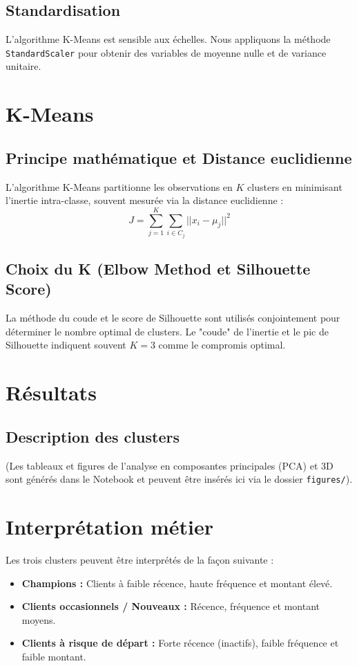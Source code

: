 \documentclass[12pt,a4paper]{article}
\begin{document}
\subsection{Standardisation}
L'algorithme K-Means est sensible aux échelles. Nous appliquons la méthode \texttt{StandardScaler} pour obtenir des variables de moyenne nulle et de variance unitaire.

\section{K-Means}
\subsection{Principe mathématique et Distance euclidienne}
L'algorithme K-Means partitionne les observations en $K$ clusters en minimisant l'inertie intra-classe, souvent mesurée via la distance euclidienne :
\begin{equation}
    J = \sum_{j=1}^{K} \sum_{i \in C_j} || x_i - \mu_j ||^2
\end{equation}
\subsection{Choix du K (Elbow Method et Silhouette Score)}
La méthode du coude et le score de Silhouette sont utilisés conjointement pour déterminer le nombre optimal de clusters. Le "coude" de l'inertie et le pic de Silhouette indiquent souvent $K=3$ comme le compromis optimal.

\section{Résultats}
\subsection{Description des clusters}
(Les tableaux et figures de l'analyse en composantes principales (PCA) et 3D sont générés dans le Notebook et peuvent être insérés ici via le dossier \texttt{figures/}).

\section{Interprétation métier}
Les trois clusters peuvent être interprétés de la façon suivante :
\begin{itemize}
    \item \textbf{Champions :} Clients à faible récence, haute fréquence et montant élevé.
    \item \textbf{Clients occasionnels / Nouveaux :} Récence, fréquence et montant moyens.
    \item \textbf{Clients à risque de départ :} Forte récence (inactifs), faible fréquence et faible montant.
\end{itemize}
\end{document}
